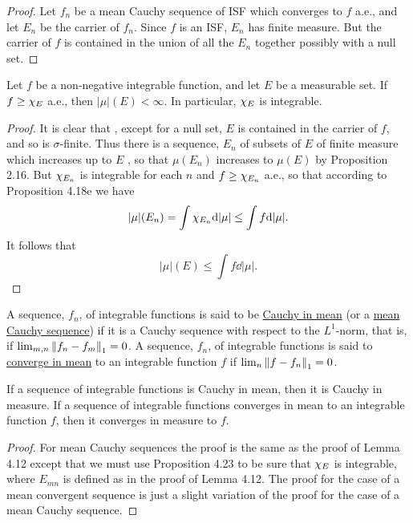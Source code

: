 \begin{proof}
Let $f_n$ be a mean Cauchy sequence of ISF which converges to $f$ a.e., and let $E_n$ be the carrier of $f_n$. Since $f$ is an ISF, $E_n$ has finite measure. But the carrier of $f$ is contained in the union of all the $E_n$ together possibly with a null set.
\end{proof}

\begin{proposition}
Let $f$ be a non-negative integrable function, and let $E$ be a measurable set. If $f\geq\chi_{E}$ a.e., then $|\mu|(E)<\infty$. In particular, $\chi_{E}$ is integrable.
\end{proposition}

\begin{proof}
It is clear that , except for a null set, $E$ is contained in the carrier of $f$, and so is $\sigma$-finite. Thus there is a sequence, $E_n$ of subsets of $E$ of finite measure which increases up to $E$ , so that $\mu(E_n)$ increases to $\mu(E)$ by Proposition 2.16. But $\chi_{E_n}$ is integrable for each $n$ and $f\geq\chi_{E_n}$ a.e., so that according to Proposition 4.18e we have $$|\mu|(E_n)=\int\chi_{E_n}\dd|\mu|\leq\int f\dd|\mu|.$$ It follows that $$|\mu|(E)\leq\int f\dd|\mu|.$$
\end{proof}

\begin{definition}
A sequence, $f_n$, of integrable functions is said to be \underline{Cauchy in mean} (or a \underline{mean Cauchy sequence}) if it is a Cauchy sequence with respect to the $L^1$-norm, that is, if $\lim_{m, n}\norm{f_n-f_m}_1=0$. A sequence, $f_n$, of integrable functions is said to \underline{converge in mean} to an integrable function $f$ if $\lim_n\norm{f-f_n}_1=0$.
\end{definition}

\begin{proposition}
If a sequence of integrable functions is Cauchy in mean, then it is Cauchy in measure. If a sequence of integrable functions converges in mean to an integrable function $f$, then it converges in measure to $f$.
\end{proposition}

\begin{proof}
For mean Cauchy sequences the proof is the same as the proof of Lemma 4.12 except that we must use Proposition 4.23 to be sure that $\chi_{E}$ is integrable, where $E_{mn}$ is defined as in the proof of Lemma 4.12. The proof for the case of a mean convergent sequence is just a slight variation of the proof for the case of a mean Cauchy sequence.
\end{proof}

